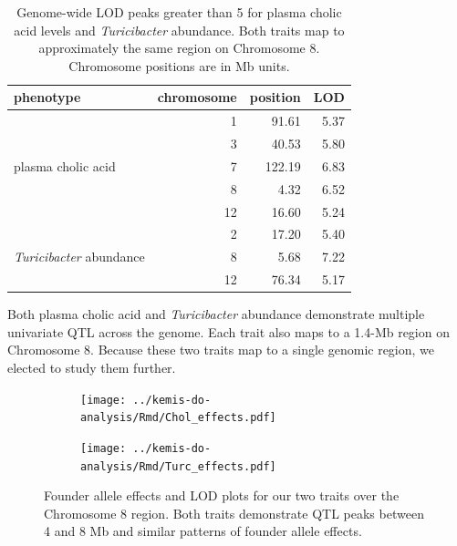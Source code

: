 \documentclass[oneside]{book}\usepackage[]{graphicx}\usepackage[]{color}
\begin{document}
\begin{table}[ht]
\centering
\begin{tabular}{lrrr}
  \hline
phenotype & chromosome & position & LOD \\ 
  \hline
\multirow{5}{*}{plasma cholic acid} &   1 & 91.61 & 5.37 \\ 
   &   3 & 40.53 & 5.80 \\ 
   &   7 & 122.19 & 6.83 \\ 
       
&   \cellcolor{LightCyan}8 & \cellcolor{LightCyan}4.32 & \cellcolor{LightCyan}6.52 \\ 
   &  12 & 16.60 & 5.24 \\ 
   \hline
 \multirow{3}{*}{\emph{Turicibacter} abundance} &   2 & 17.20 & 5.40 \\ 
  &   \cellcolor{LightCyan}8 & \cellcolor{LightCyan}5.68 & \cellcolor{LightCyan}7.22 \\ 
  &  12 & 76.34 & 5.17 \\ 
   \hline
\end{tabular}
\caption{\label{tab:3c-lod-peaks}Genome-wide LOD peaks greater than 5 for plasma cholic acid levels and \emph{Turicibacter} abundance. Both traits map to approximately the same region on Chromosome 8. Chromosome positions are in Mb units.}
\end{table}

Both plasma cholic acid and \emph{Turicibacter} abundance demonstrate multiple univariate QTL across the genome. Each trait also maps to a 1.4-Mb region on Chromosome 8. Because these two traits map to a single genomic region, we elected to study them further. 



\begin{figure}
\begin{subfigure}[b]{\textwidth}
\centering
\texttt{[image: ../kemis-do-analysis/Rmd/Chol\_effects.pdf]}
\end{subfigure}

\begin{subfigure}[b]{\textwidth}
\centering
\texttt{[image: ../kemis-do-analysis/Rmd/Turc\_effects.pdf]}
\end{subfigure}
\caption{Founder allele effects and LOD plots for our two traits over the Chromosome 8 region. Both traits demonstrate QTL peaks between 4 and 8 Mb and similar patterns of founder allele effects.}\label{fig:3c-effects}
\end{figure}
\end{document}
